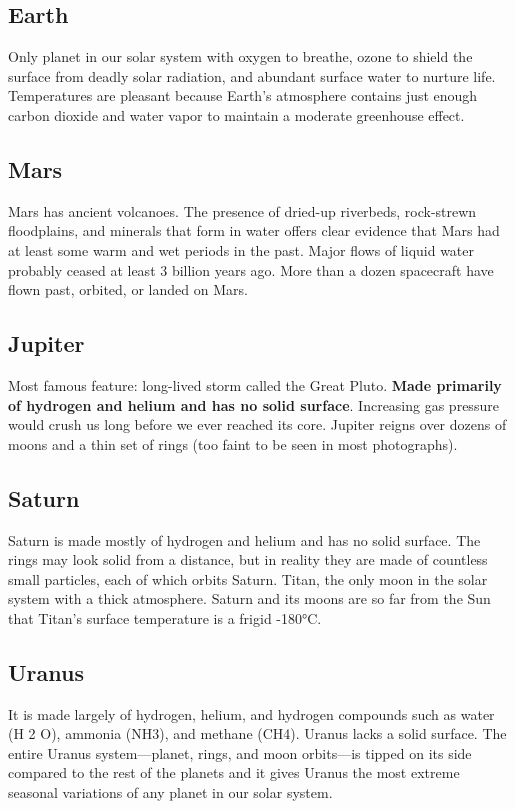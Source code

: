 \subsection{Earth}
Only planet in our solar system with oxygen to breathe, ozone to shield the surface from deadly solar radiation, and abundant surface water to nurture life. Temperatures are pleasant because Earth’s atmosphere contains just enough carbon dioxide and water vapor to maintain a moderate greenhouse effect.

\subsection{Mars}
Mars has ancient volcanoes. The presence of dried-up riverbeds, rock-strewn floodplains, and minerals that form in water offers clear evidence that Mars had at least some warm and wet periods in the past. Major flows of liquid water probably ceased at least 3 billion years ago. More than a dozen spacecraft have flown past, orbited, or landed on Mars.

\subsection{Jupiter}
Most famous feature: long-lived storm called the Great Pluto. {\bf Made primarily of hydrogen and helium and has no solid surface}. Increasing gas pressure would crush us long before we ever reached its core. Jupiter reigns over dozens of moons and a thin set of rings (too faint to be seen in most photographs).

\subsection{Saturn}
Saturn is made mostly of hydrogen and helium and has no solid surface. The rings may look solid from a distance, but in reality they are made of countless small particles, each of which orbits Saturn. Titan, the only moon in the solar system with a thick atmosphere. Saturn and its moons are so far from the Sun that Titan’s surface temperature is a
frigid -180°C.

\subsection{Uranus}
It is made largely of hydrogen, helium, and hydrogen compounds such as water (H 2 O), ammonia (NH3), and methane (CH4). Uranus lacks a solid surface. The entire Uranus system—planet, rings, and moon orbits—is tipped on its side compared to the rest of the planets and it gives Uranus the most extreme seasonal variations of any planet in our solar system.

